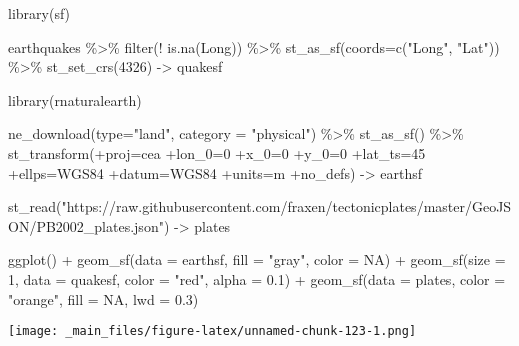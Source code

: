 \documentclass[11pt,german,a4paper]{article}
\newenvironment{Shaded}{\begin{snugshade}}{\end{snugshade}}
\newcommand{\AttributeTok}[1]{\textcolor[rgb]{0.77,0.63,0.00}{#1}}
\newcommand{\ConstantTok}[1]{\textcolor[rgb]{0.00,0.00,0.00}{#1}}
\newcommand{\DecValTok}[1]{\textcolor[rgb]{0.00,0.00,0.81}{#1}}
\newcommand{\FloatTok}[1]{\textcolor[rgb]{0.00,0.00,0.81}{#1}}
\newcommand{\FunctionTok}[1]{\textcolor[rgb]{0.00,0.00,0.00}{#1}}
\newcommand{\NormalTok}[1]{#1}
\newcommand{\OtherTok}[1]{\textcolor[rgb]{0.56,0.35,0.01}{#1}}
\newcommand{\SpecialCharTok}[1]{\textcolor[rgb]{0.00,0.00,0.00}{#1}}
\newcommand{\StringTok}[1]{\textcolor[rgb]{0.31,0.60,0.02}{#1}}
\begin{document}
\begin{Shaded}
\begin{Highlighting}[]
\FunctionTok{library}\NormalTok{(sf)}

\NormalTok{earthquakes }\SpecialCharTok{\%\textgreater{}\%}
  \FunctionTok{filter}\NormalTok{(}\SpecialCharTok{!} \FunctionTok{is.na}\NormalTok{(Long)) }\SpecialCharTok{\%\textgreater{}\%}
  \FunctionTok{st\_as\_sf}\NormalTok{(}\AttributeTok{coords=}\FunctionTok{c}\NormalTok{(}\StringTok{"Long"}\NormalTok{, }\StringTok{"Lat"}\NormalTok{)) }\SpecialCharTok{\%\textgreater{}\%}
  \FunctionTok{st\_set\_crs}\NormalTok{(}\DecValTok{4326}\NormalTok{) }\OtherTok{{-}\textgreater{}}\NormalTok{ quakesf}

\FunctionTok{library}\NormalTok{(rnaturalearth)}

\FunctionTok{ne\_download}\NormalTok{(}\AttributeTok{type=}\StringTok{"land"}\NormalTok{, }\AttributeTok{category =} \StringTok{"physical"}\NormalTok{) }\SpecialCharTok{\%\textgreater{}\%}
  \FunctionTok{st\_as\_sf}\NormalTok{() }\SpecialCharTok{\%\textgreater{}\%}
  \FunctionTok{st\_transform}\NormalTok{(}\StringTok{\textquotesingle{}+proj=cea +lon\_0=0 +x\_0=0 +y\_0=0 +lat\_ts=45 +ellps=WGS84 +datum=WGS84 +units=m +no\_defs\textquotesingle{}}\NormalTok{) }\OtherTok{{-}\textgreater{}}\NormalTok{ earthsf}

\FunctionTok{st\_read}\NormalTok{(}\StringTok{"https://raw.githubusercontent.com/fraxen/tectonicplates/master/GeoJSON/PB2002\_plates.json"}\NormalTok{) }\OtherTok{{-}\textgreater{}}\NormalTok{ plates}

\FunctionTok{ggplot}\NormalTok{() }\SpecialCharTok{+}
  \FunctionTok{geom\_sf}\NormalTok{(}\AttributeTok{data =}\NormalTok{ earthsf, }\AttributeTok{fill =} \StringTok{"gray"}\NormalTok{, }\AttributeTok{color =} \ConstantTok{NA}\NormalTok{) }\SpecialCharTok{+}
  \FunctionTok{geom\_sf}\NormalTok{(}\AttributeTok{size =} \DecValTok{1}\NormalTok{, }\AttributeTok{data =}\NormalTok{ quakesf, }\AttributeTok{color =} \StringTok{"red"}\NormalTok{, }\AttributeTok{alpha =} \FloatTok{0.1}\NormalTok{) }\SpecialCharTok{+}
  \FunctionTok{geom\_sf}\NormalTok{(}\AttributeTok{data =}\NormalTok{ plates, }\AttributeTok{color =} \StringTok{"orange"}\NormalTok{, }\AttributeTok{fill =} \ConstantTok{NA}\NormalTok{, }\AttributeTok{lwd =} \FloatTok{0.3}\NormalTok{)}
\end{Highlighting}
\end{Shaded}

\texttt{[image: \_main\_files/figure-latex/unnamed-chunk-123-1.png]}
\end{document}
